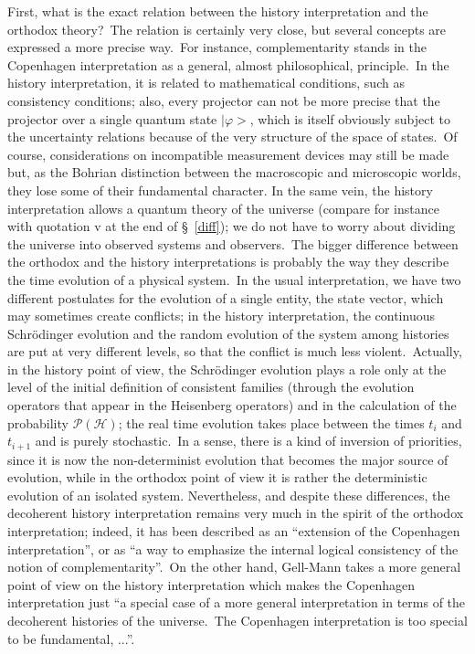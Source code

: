 \documentclass[12pt,onecolumn]{article}%
\begin{document}
First, what is the exact relation between the history interpretation and the
orthodox theory?\ The relation is certainly very close, but several concepts
are expressed a more precise way.\ For instance, complementarity stands in the
Copenhagen interpretation as a general, almost philosophical, principle.\ In
the history interpretation, it is related to mathematical conditions, such as
consistency conditions; also, every projector can not be more precise that the
projector over a single quantum state $|\varphi>$, which is itself
obviously subject to the uncertainty relations because of the very structure
of the space of states.\ Of course, considerations on incompatible measurement
devices may still be made but, as the Bohrian distinction between the
macroscopic and microscopic worlds, they lose some of their fundamental
character. In the same vein, the history interpretation allows a quantum
theory of the universe (compare for instance with quotation v at the end of
\S \ \ref{diff}); we do not have to worry about dividing the universe into
observed systems and observers.\ The bigger difference between the orthodox
and the history interpretations is probably the way they describe the time
evolution of a physical system.\ In the usual interpretation, we have two
different postulates for the evolution of a single entity, the state vector,
which may sometimes create conflicts; in the history interpretation, the
continuous Schr\"{o}dinger evolution and the random evolution of the system
among histories are put at very different levels, so that the conflict is much
less violent.\ Actually, in the history point of view, the Schr\"{o}dinger
evolution plays a role only at the level of the initial definition of
consistent families (through the evolution operators that appear in the
Heisenberg operators) and in the calculation of the probability $\mathcal{P}%
\mathbb{(\mathcal{H})}$; the real time evolution takes place between the times
$t_{i}$ and $t_{i+1}$ and is purely stochastic.\ In a sense, there is a kind
of inversion of priorities, since it is now the non-determinist evolution that
becomes the major source of evolution, while in the orthodox point of view it
is rather the deterministic evolution of an isolated system. Nevertheless, and
despite these differences, the decoherent history interpretation remains very
much in the spirit of the orthodox interpretation; indeed, it has been
described as an ``extension of the Copenhagen interpretation'', or as ``a way
to emphasize the internal logical consistency of the notion of
complementarity''.\ On the other hand, Gell-Mann takes a more general point of
view on the history interpretation which makes the Copenhagen interpretation
just ``a special case of a more general interpretation in terms of the
decoherent histories of the universe.\ The Copenhagen interpretation is too
special to be fundamental, ...''\cite{reactions}.
\end{document}
